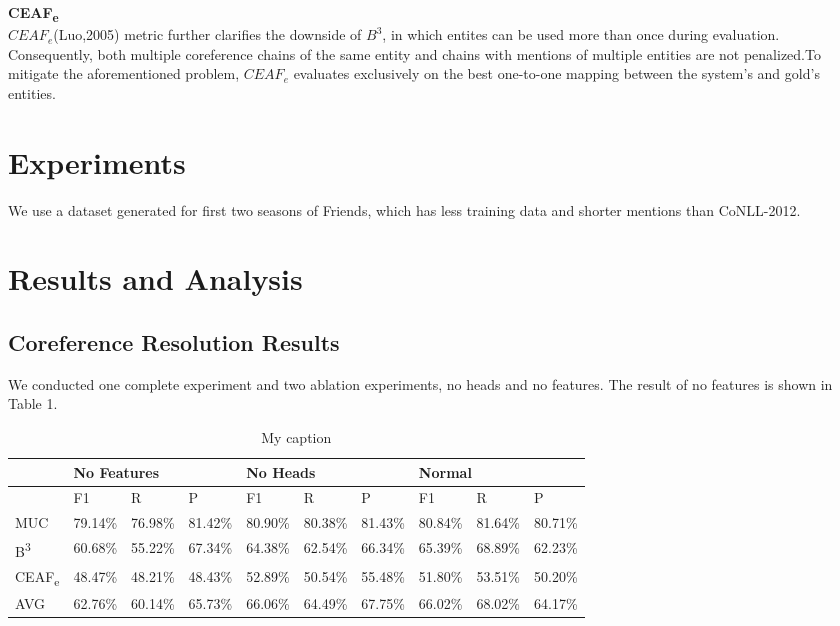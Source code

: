 \documentclass[11pt]{article}
\begin{document}
\textbf{CEAF\textsubscript{e}} \\
$CEAF_e$(Luo,2005) metric further clarifies the downside of $B^{3}$, in which entites can be used more than once during evaluation. Consequently, both multiple coreference chains of the same entity and chains with mentions of multiple entities are not penalized.To mitigate the aforementioned problem, $CEAF_e$ evaluates exclusively on the best one-to-one mapping between the system’s and gold’s entities.

\section{Experiments}
We use a dataset generated for first two seasons of Friends, which has less training data and shorter mentions than CoNLL-2012.

\section{Results and Analysis}

\subsection{Coreference Resolution Results}
We conducted one complete experiment and two ablation experiments, no heads and no features. The result of no features is shown in Table 1.

\begin{table}[]
\centering
\caption{My caption}
\label{my-label}
\begin{tabular}{|l|l|l|l|l|l|l|l|l|l|}
\hline
        & \multicolumn{3}{l|}{No Features} & \multicolumn{3}{l|}{No Heads} & \multicolumn{3}{l|}{Normal}   \\ \hline
        & F1       & R   & P  & F1      & R  & P & F1      & R  & P \\ \hline
MUC     & 79.14\%  & 76.98\%  & 81.42\%    & 80.90\% & 80.38\% & 81.43\%   & 80.84\% & 81.64\% & 80.71\%   \\ \hline
B\textsuperscript{3}      & 60.68\%  & 55.22\%  & 67.34\%    & 64.38\% & 62.54\% & 66.34\%   & 65.39\% & 68.89\% & 62.23\%   \\ \hline
CEAF\textsubscript{e} & 48.47\%  & 48.21\%  & 48.43\%    & 52.89\% & 50.54\% & 55.48\%   & 51.80\% & 53.51\% & 50.20\%   \\ \hline
AVG     & 62.76\%  & 60.14\%  & 65.73\%    & 66.06\% & 64.49\% & 67.75\%   & 66.02\% & 68.02\% & 64.17\%   \\ \hline
\end{tabular}
\end{table}
\end{document}
